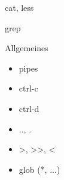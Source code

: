     \begin{frame}{cat, less}
    \end{frame}

    \begin{frame}{grep}
    \end{frame}

    \begin{frame}{Allgemeines}
      \begin{itemize}
        \item pipes\\
        \item ctrl-c\\
        \item ctrl-d\\
        \item .., .\\
        \item >, >>, <\\
        \item glob (*, ...)
      \end{itemize}
    \end{frame}
